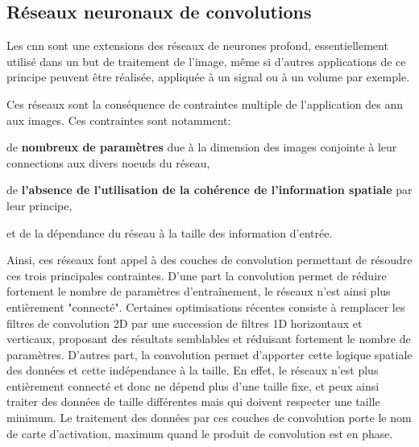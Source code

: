 \subsection{Réseaux neuronaux de convolutions}
Les \gls{cnn} sont une extensions des réseaux de neurones profond, essentiellement utilisé dans un but de traitement de l'image, même si d'autres applications de ce principe peuvent être réalisée, appliquée à un signal ou à un volume par exemple.\par

Ces réseaux sont la conséquence de contraintes multiple de l'application des \gls{ann} aux images. Ces contraintes sont notamment: 
\begin{inlinerate}
\item de \textbf{nombreux de paramètres} due à la dimension des images conjointe à leur connections aux divers noeuds du réseau,
\item de \textbf{l'absence de l'utilisation de la cohérence de l'information spatiale} par leur principe,
\item et de la dépendance du réseau à la taille des information d'entrée.
\end{inlinerate}\par

Ainsi, ces réseaux font appel à des couches de convolution permettant de résoudre ces trois principales contraintes. D'une part la convolution permet de réduire fortement le nombre de paramètres d'entraînement, le réseaux n'est ainsi plus entièrement "connecté". Certaines optimisations récentes consiste à remplacer les filtres de convolution 2D par une succession de filtres 1D horizontaux et verticaux, proposant des résultats semblables et réduisant fortement le nombre de paramètres. D'autres part, la convolution permet d'apporter cette logique spatiale des données et cette indépendance à la taille. En effet, le réseaux n'est plus entièrement connecté et donc ne dépend plus d'une taille fixe, et peux ainsi traiter des données de taille différentes mais qui doivent respecter une taille minimum. Le traitement des données par ces couches de convolution porte le nom de carte d'activation, maximum quand le produit de convolution est en phase.\par


